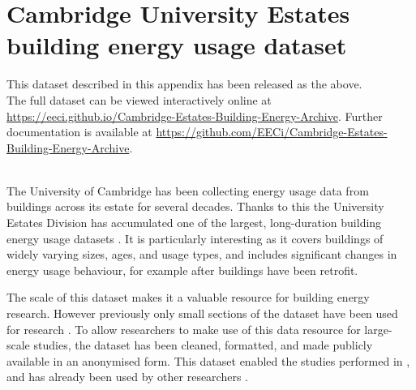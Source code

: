 
\chapter{Cambridge University Estates building energy usage dataset} \label{app:data}

\graphicspath{{Data/Figs/}}


\begin{cbox}[colback=Cerulean!10!white]{}

    \noindent{\color{black!50}\rule{\textwidth}{0.4mm}}\vspace{2mm}

    \noindent
    This dataset described in this appendix has been released as the above.\\

    \noindent
    The full dataset can be viewed interactively online at \url{https://eeci.github.io/Cambridge-Estates-Building-Energy-Archive}. Further documentation is available at \url{https://github.com/EECi/Cambridge-Estates-Building-Energy-Archive}.

\end{cbox}

\hfill \\

\noindent
The University of Cambridge has been collecting energy usage data from buildings across its estate for several decades. Thanks to this the University Estates Division has accumulated one of the largest, long-duration building energy usage datasets \citep{kang2023SystematicReviewBuilding}. It is particularly interesting as it covers buildings of widely varying sizes, ages, and usage types, and includes significant changes in energy usage behaviour, for example after buildings have been retrofit.

The scale of this dataset makes it a valuable resource for building energy research. However previously only small sections of the dataset have been used for research \citep{pickering2019DistrictEnergySystem,ward2019DatacentricBottomupModel,ward2021tool,zhuang2023UncertaintybasedOptimalEnergy}. To allow researchers to make use of this data resource for large-scale studies, the dataset has been cleaned, formatted, and made publicly available in an anonymised form. This dataset enabled the studies performed in , and has already been used by other researchers \citep{choi2025RepresentationVectorBasedTime}.

